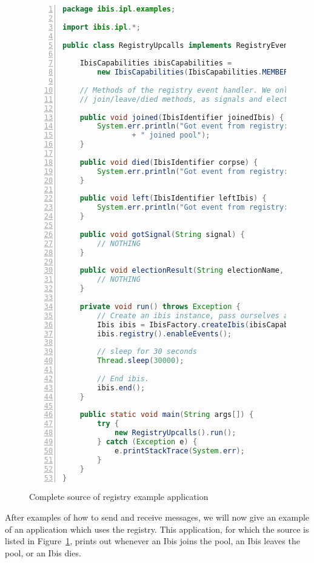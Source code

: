 \begin{figure}[p]
\lstset{basicstyle=\footnotesize,breaklines=false}
\begin{lstlisting}[language=Java,numbers=left, numbersep=3pt]
package ibis.ipl.examples;

import ibis.ipl.*;

public class RegistryUpcalls implements RegistryEventHandler {

    IbisCapabilities ibisCapabilities =
        new IbisCapabilities(IbisCapabilities.MEMBERSHIP_TOTALLY_ORDERED);
    
    // Methods of the registry event handler. We only implement the 
    // join/leave/died methods, as signals and elections are disabled
    
    public void joined(IbisIdentifier joinedIbis) {
        System.err.println("Got event from registry: " + joinedIbis
                + " joined pool");
    }

    public void died(IbisIdentifier corpse) {
        System.err.println("Got event from registry: " + corpse + " died!");
    }

    public void left(IbisIdentifier leftIbis) {
        System.err.println("Got event from registry: " + leftIbis + " left");
    }

    public void gotSignal(String signal) {
        // NOTHING
    }

    public void electionResult(String electionName, IbisIdentifier winner) {
        // NOTHING
    }
    
    private void run() throws Exception {
        // Create an ibis instance, pass ourselves as the event handler
        Ibis ibis = IbisFactory.createIbis(ibisCapabilities, this);
        ibis.registry().enableEvents();

        // sleep for 30 seconds
        Thread.sleep(30000);

        // End ibis.
        ibis.end();
    }

    public static void main(String args[]) {
        try {
            new RegistryUpcalls().run();
        } catch (Exception e) {
            e.printStackTrace(System.err);
        }
    }
}
\end{lstlisting}
\caption{Complete source of registry example application}
\label{registry_source}
\end{figure}

After examples of how to send and receive messages, we will now give an
example of an application which uses the registry. This application,
for which the source is listed in Figure~\ref{registry_source}, prints
out whenever an Ibis joins the pool, an Ibis leaves the pool, or an Ibis
dies.

